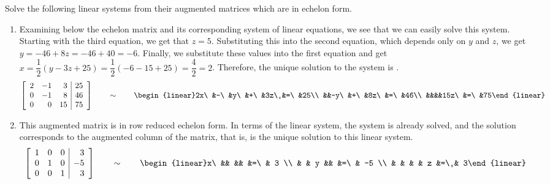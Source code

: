 \begin{Exam} Solve the following linear systems from their augmented matrices which are in echelon form.
\begin{enumerate}
\item Examining below the echelon matrix and its corresponding system of linear equations, we see that we can easily solve this system. Starting with the third equation, we get that $z=5$. Substituting this into the second equation, which depends only on $y$ and $z$, we get $y = -46+8z = -46+40 = -6$. Finally, we substitute these values into the first equation and get $x=\dfrac{1}{2}(y-3z+25) = \dfrac{1}{2}(-6-15+25)= \dfrac{4}{2} = 2$. Therefore, the unique solution to the system is . 
\[ \mtx{rrr|r}{ 2& -1&3&25\\0&-1&8&46\\0&0&15&75} \qquad\sim\qquad \begin{linear}2x\ &-\ &y\ &+\ &3z\ &=\ &25\\ &&-y\ &+\ &8z\ &=\ &46\\ &&&&15z\ &=\ &75\end{linear}\]

\item This augmented matrix is in row reduced echelon form. In terms of the linear system, the system is already solved, and the solution corresponds to the augmented column of the matrix, that is,  is the unique solution to this linear system.
\[ \mtx{rrr|r}{ 1 & 0 & 0 & 3 \\ 0 & 1 & 0 & -5 \\ 0 & 0 & 1 & 3} \qquad\sim\qquad \begin{linear}x\ &&  &&  &=\ & 3 \\ & & y &&  &=\ & -5 \\ & & & & z &=\ & 3\end{linear}\]


\end{enumerate}
\end{Exam}
